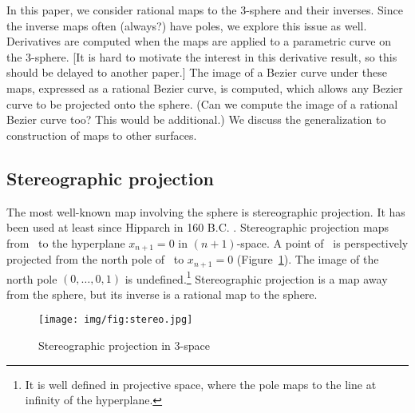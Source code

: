 \documentclass[11pt]{article}
\begin{document}
In this paper, we consider rational maps to the 3-sphere and their inverses.
Since the inverse maps often (always?) have poles, we explore this issue as well.
Derivatives are computed when the maps are applied to a parametric curve on 
the 3-sphere.
[It is hard to motivate the interest in this derivative result, so this should
be delayed to another paper.]
The image of a Bezier curve under these maps, expressed as a rational Bezier curve,
is computed, which allows any Bezier curve to be projected onto the sphere.
(Can we compute the image of a rational Bezier curve too? This would be additional.)
We discuss the generalization to construction of maps to other surfaces.

\subsection{Stereographic projection}
\label{sec:stereo}

The most well-known map involving the sphere is stereographic projection.
It has been used at least since Hipparch in 160 B.C. \cite{kreyszig59}. %
Stereographic projection maps from \ to the hyperplane $x_{n+1}=0$ in $(n+1)$-space.
A point of \ is perspectively projected from 
the north pole of \ to $x_{n+1}=0$  %
(Figure~\ref{fig:stereo}).
The image of the north pole $(0,\ldots,0,1)$ is undefined.\footnote{It is well defined
  in projective space, where the pole maps to the line at infinity of the hyperplane.}
Stereographic projection is a map away from the sphere, 
but its inverse is a rational map to the sphere.

\begin{figure}[ht]
\begin{center}
\texttt{[image: img/fig:stereo.jpg]}
\end{center}
\caption{Stereographic projection in 3-space}
\label{fig:stereo}
\end{figure}
\end{document}
